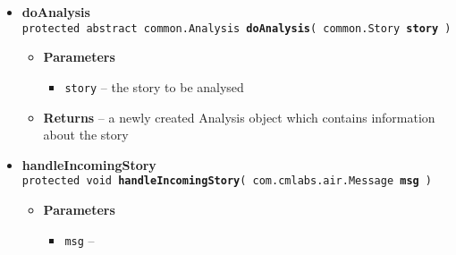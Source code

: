 {{{\begin{itemize}
{\begin{itemize}
{When a message comes in, this method is called on the set implementer of this interface.
}
\item{
{\bf Parameters}
  \begin{itemize}
   \item{
{\tt msg} -- }
  \end{itemize}
}%
\item{{\bf Returns} -- 
true if the message was handled, false if it wasn't 
}%
\end{itemize}
}%
 \item{ 
{\bf doAnalysis}\\
{\tt protected abstract common.Analysis\ {\bf doAnalysis}( {\tt common.Story} {\bf story} )
\label{amber.Sieve.doAnalysis(amber.common.Story)}}%
\begin{itemize}
\item{
{\bf Parameters}
  \begin{itemize}
   \item{
{\tt story} -- the story to be analysed}
  \end{itemize}
}%
\item{{\bf Returns} -- 
a newly created Analysis object which contains information about the story 
}%
\end{itemize}
}%
 \item{ 
{\bf handleIncomingStory}\\
{\tt protected void\ {\bf handleIncomingStory}( {\tt com.cmlabs.air.Message} {\bf msg} )
\label{amber.Sieve.handleIncomingStory(com.cmlabs.air.Message)}}%
\begin{itemize}
\item{
{\bf Parameters}
  \begin{itemize}
   \item{
{\tt msg} -- }
  \end{itemize}
}%
\end{itemize}
}%
\end{itemize}
}
}
}
